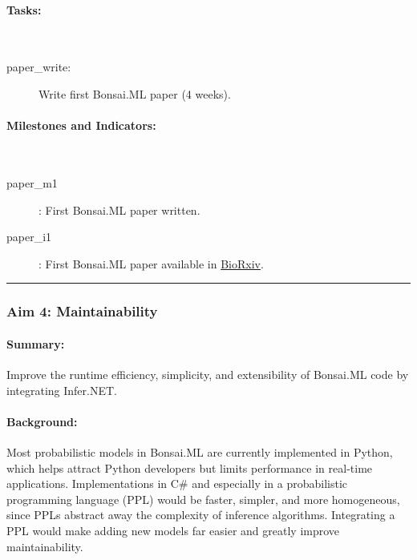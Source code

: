 \paragraph{Tasks:}\mbox{}\\

\begin{description}

    \item[paper\_write:] Write first Bonsai.ML paper (4 weeks).

\end{description}

\paragraph{Milestones and Indicators:}\mbox{}\\

\begin{description}

    \item[paper\_m1]: First Bonsai.ML paper written.
    \item[paper\_i1]: First Bonsai.ML paper available in
        \href{https://www.biorxiv.org/}{BioRxiv}.

\end{description}

\noindent\rule{\textwidth}{1pt}
\subsubsection{Aim 4: Maintainability}

\paragraph{Summary:} Improve the runtime efficiency, simplicity, and
extensibility of Bonsai.ML code by integrating Infer.NET.

\paragraph{Background:}
Most probabilistic models in Bonsai.ML are currently
implemented in Python, which helps attract Python developers but limits
performance in real-time applications. Implementations in C\# and especially in
a probabilistic programming language (PPL) would be faster, simpler, and more
homogeneous, since PPLs abstract away the complexity of inference algorithms.
Integrating a PPL would make adding new models far easier and greatly improve
maintainability.  

